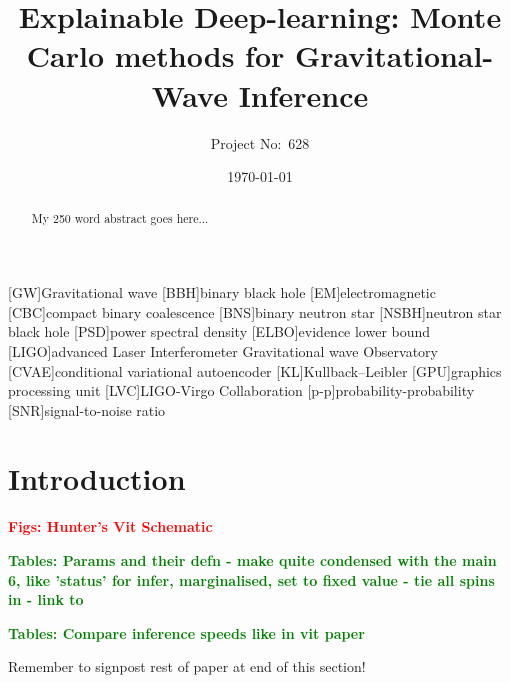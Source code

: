 \documentclass[aps,superscriptaddress,twocolumn,nopreprintnumbers,floatfix,groupedaddress]{revtex4-1}
\newcommand{\vitamin}{{\sc VItamin}\xspace}
\begin{document}
\title{Explainable Deep-learning: Monte Carlo methods for Gravitational-Wave Inference}

\author{Project No:~628}
%

\date{\today}

\begin{abstract}
My 250 word abstract goes here...
\end{abstract}

\maketitle

[GW]{Gravitational wave}
[BBH]{binary black hole}
[EM]{electromagnetic}
[CBC]{compact binary coalescence}
[BNS]{binary neutron star}
[NSBH]{neutron star black hole}
[PSD]{power spectral density}
[ELBO]{evidence lower bound}
[LIGO]{advanced Laser Interferometer Gravitational wave Observatory}
[CVAE]{conditional variational autoencoder}
[KL]{Kullback--Leibler}
[GPU]{graphics processing unit}
[LVC]{LIGO-Virgo Collaboration}
[p-p]{probability-probability}
[SNR]{signal-to-noise ratio}

\section{Introduction}\label{intro}

\textbf{\textcolor{red}{Figs: Hunter's Vit Schematic}}

\textbf{\textcolor{green}{Tables: Params and their defn - make quite condensed with the main 6, like 'status' for infer, marginalised, set to fixed value - tie all spins in - link to }}

\textbf{\textcolor{green}{Tables: Compare inference speeds like in vit paper}}

Remember to signpost rest of paper at end of this section!

%
\end{document}
